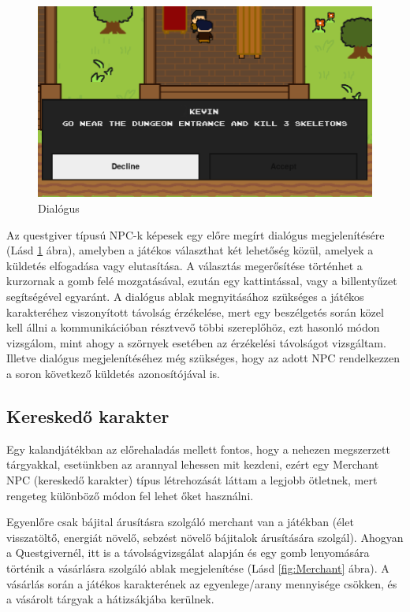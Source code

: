        \begin{figure}[H]
        \centering
        \includegraphics[width=12.0truecm]{images/dialogue.png}
        \caption{Dialógus}
        \label{fig:Dialógus rendszer}
    \end{figure}
    
Az questgiver típusú NPC-k képesek egy előre megírt dialógus megjelenítésére (Lásd \ref{fig:Dialógus rendszer} ábra), amelyben a játékos választhat két lehetőség közül, amelyek a küldetés elfogadása vagy elutasítása. A választás megerősítése történhet a kurzornak a gomb felé mozgatásával, ezután egy kattintással, vagy a billentyűzet segítségével egyaránt. A dialógus ablak megnyitásához szükséges a játékos karakteréhez viszonyított távolság érzékelése, mert egy beszélgetés során közel kell állni a kommunikációban résztvevő többi szereplőhöz, ezt hasonló módon vizsgálom, mint ahogy a szörnyek esetében az érzékelési távolságot vizsgáltam. Illetve dialógus megjelenítéséhez még szükséges, hogy az adott NPC rendelkezzen a soron következő küldetés azonosítójával is.   



\subsection{Kereskedő karakter}

 Egy kalandjátékban az előrehaladás mellett fontos, hogy a nehezen megszerzett tárgyakkal,
 esetünkben az arannyal lehessen mit kezdeni, ezért egy Merchant NPC (kereskedő karakter) típus létrehozását láttam a legjobb ötletnek,
  mert rengeteg különböző módon fel lehet őket használni. 

Egyenlőre csak bájital árusításra szolgáló merchant van a játékban (élet visszatöltő, energiát növelő, sebzést növelő bájitalok árusítására szolgál).
   Ahogyan a Questgivernél, itt is a távolságvizsgálat alapján és egy gomb lenyomására történik a vásárlásra szolgáló ablak megjelenítése (Lásd \ref{fig:Merchant} ábra).
     A vásárlás során a játékos karakterének az egyenlege/arany mennyisége csökken, és a vásárolt tárgyak a hátizsákjába kerülnek.

